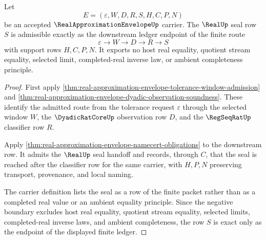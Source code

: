 \begin{theorem}
\label{thm:real-approximation-envelope-seal-ledger-exactness}
Let
$$
E=(\varepsilon,W,D,R,S,H,C,P,N)
$$
be an accepted $\RealApproximationEnvelopeUp$ carrier. The $\RealUp$ seal row $S$ is admissible exactly as the downstream ledger endpoint of the finite route
$$
\varepsilon \longrightarrow W \longrightarrow D \longrightarrow R \longrightarrow S
$$
with support rows $H,C,P,N$. It exports no host real equality, quotient stream equality, selected limit, completed-real inverse law, or ambient completeness principle.
\end{theorem}
\begin{proof}
First apply \autoref{thm:real-approximation-envelope-tolerance-window-admission} and \autoref{thm:real-approximation-envelope-dyadic-observation-soundness}. These identify the admitted route from the tolerance request $\varepsilon$ through the selected window $W$, the $\DyadicRatCoreUp$ observation row $D$, and the $\RegSeqRatUp$ classifier row $R$.

Apply \autoref{thm:real-approximation-envelope-namecert-obligations} to the downstream row. It admits the $\RealUp$ seal handoff and records, through $C$, that the seal is reached after the classifier row for the same carrier, with $H,P,N$ preserving transport, provenance, and local naming.

The carrier definition lists the seal as a row of the finite packet rather than as a completed real value or an ambient equality principle. Since the negative boundary excludes host real equality, quotient stream equality, selected limits, completed-real inverse laws, and ambient completeness, the row $S$ is exact only as the endpoint of the displayed finite ledger.
\end{proof}

